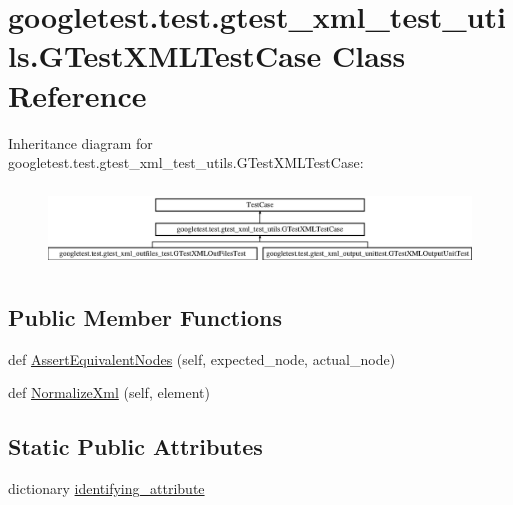 \hypertarget{classgoogletest_1_1test_1_1gtest__xml__test__utils_1_1_g_test_x_m_l_test_case}{}\section{googletest.\+test.\+gtest\+\_\+xml\+\_\+test\+\_\+utils.\+G\+Test\+X\+M\+L\+Test\+Case Class Reference}
\label{classgoogletest_1_1test_1_1gtest__xml__test__utils_1_1_g_test_x_m_l_test_case}
Inheritance diagram for googletest.\+test.\+gtest\+\_\+xml\+\_\+test\+\_\+utils.\+G\+Test\+X\+M\+L\+Test\+Case\+:\begin{figure}[H]
\begin{center}
\leavevmode
\includegraphics[height=2.176166cm]{da/d26/classgoogletest_1_1test_1_1gtest__xml__test__utils_1_1_g_test_x_m_l_test_case}
\end{center}
\end{figure}
\subsection*{Public Member Functions}
\begin{DoxyCompactItemize}
\item 
def \mbox{\hyperlink{classgoogletest_1_1test_1_1gtest__xml__test__utils_1_1_g_test_x_m_l_test_case_a053fcff673804c118cdceb4e44af290a}{Assert\+Equivalent\+Nodes}} (self, expected\+\_\+node, actual\+\_\+node)
\item 
def \mbox{\hyperlink{classgoogletest_1_1test_1_1gtest__xml__test__utils_1_1_g_test_x_m_l_test_case_acaccf5c860f8404da1bb4031d022103d}{Normalize\+Xml}} (self, element)
\end{DoxyCompactItemize}
\subsection*{Static Public Attributes}
\begin{DoxyCompactItemize}
\item 
dictionary \mbox{\hyperlink{classgoogletest_1_1test_1_1gtest__xml__test__utils_1_1_g_test_x_m_l_test_case_af1dd766e69fa96093cf22b75bec0845c}{identifying\+\_\+attribute}}
\end{DoxyCompactItemize}

